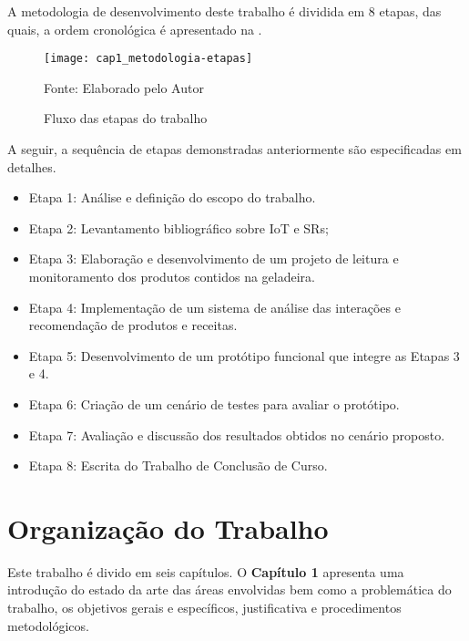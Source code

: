A metodologia de desenvolvimento deste trabalho é dividida em 8 etapas, das quais, a ordem cronológica é apresentado na .

\begin{figure}[htb]
    \caption{Fluxo das etapas do trabalho}
    \texttt{[image: cap1\_metodologia-etapas]}
    \label{fig:cap1_metodologia-etapas}
    
    \footnotesize{Fonte: Elaborado pelo Autor}
\end{figure}

A seguir, a sequência de etapas demonstradas anteriormente são especificadas em detalhes.

\begin{itemize}[noitemsep,topsep=5pt]%
    \item Etapa 1: Análise e definição do escopo do trabalho.
	\item Etapa 2: Levantamento bibliográfico sobre IoT e SRs;
	\item Etapa 3: Elaboração e desenvolvimento de um projeto de leitura e monitoramento dos produtos contidos na geladeira.
	\item Etapa 4: Implementação de um sistema de análise das interações e recomendação de produtos e receitas.
	\item Etapa 5: Desenvolvimento de um protótipo funcional que integre as Etapas 3 e 4.
	\item Etapa 6: Criação de um cenário de testes para avaliar o protótipo.
	\item Etapa 7: Avaliação e discussão dos resultados obtidos no cenário proposto.
	\item Etapa 8: Escrita do Trabalho de Conclusão de Curso.
\end{itemize}




\section{Organização do Trabalho} %

Este trabalho é divido em seis capítulos. O \textbf{Capítulo 1} apresenta uma introdução do estado da arte das áreas envolvidas bem como a problemática do trabalho, os objetivos gerais e específicos, justificativa e procedimentos metodológicos.

